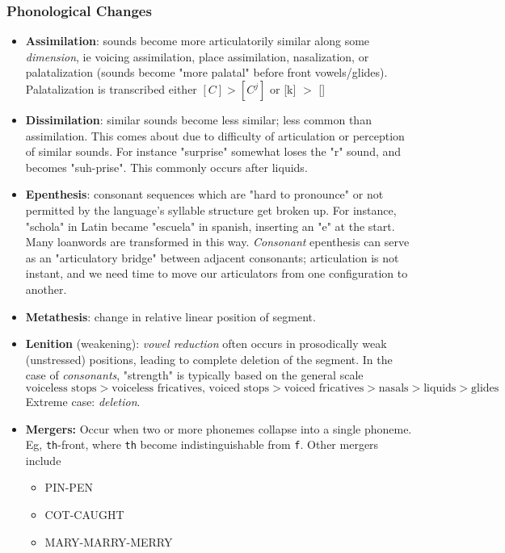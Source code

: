 \documentclass[12pt]{article}
\begin{document}
\subsubsection{Phonological Changes}
\begin{itemize}
  \item \textbf{Assimilation}: sounds become more articulatorily similar along some \textit{dimension}, ie voicing assimilation, place assimilation, nasalization, or palatalization (sounds become "more palatal" before front vowels/glides). Palatalization is transcribed either $[C] > [C^j]$ or [k] $>$ []
  \item \textbf{Dissimilation}: similar sounds become less similar; less common than assimilation. This comes about due to difficulty of articulation or perception of similar sounds. For instance "surprise" somewhat loses the "r" sound, and becomes "suh-prise". This commonly occurs after liquids. 
  \item \textbf{Epenthesis}: consonant sequences which are "hard to pronounce" or not permitted by the language's syllable structure get broken up. For instance, "schola" in Latin became "escuela" in spanish, inserting an "e" at the start. Many loanwords are transformed in this way. \textit{Consonant} epenthesis can serve as an "articulatory bridge" between adjacent consonants; articulation is not instant, and we need time to move our articulators from one configuration to another.
  \item \textbf{Metathesis}: change in relative linear position of segment.
  \item \textbf{Lenition} (weakening):  \textit{vowel reduction} often occurs in prosodically weak (unstressed) positions, leading to complete deletion of the segment. In the case of \textit{consonants}, "strength" is typically based on the general scale \[\text{voiceless stops} > \text{voiceless fricatives, voiced stops} > \text{voiced fricatives} > \text{nasals} > \text{liquids} > \text{glides}\] Extreme case: \textit{deletion}.
  \item \textbf{Mergers:} Occur when two or more phonemes collapse into a single phoneme. Eg, \texttt{th}-front, where \texttt{th} become indistinguishable from \texttt{f}. Other mergers include \begin{itemize}
    \item PIN-PEN %
    \item COT-CAUGHT 
    \item MARY-MARRY-MERRY
  \end{itemize}

\end{itemize}
\end{document}
